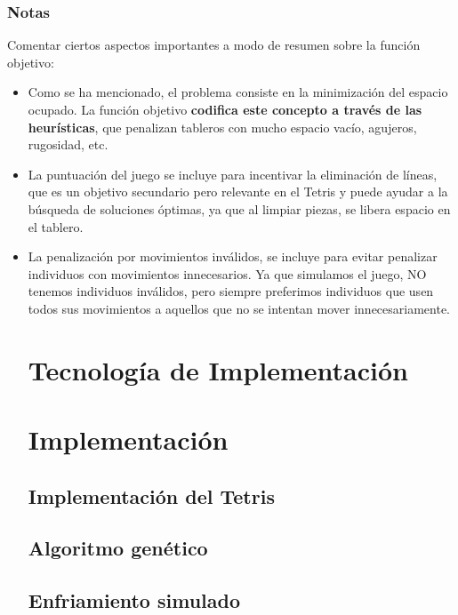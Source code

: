 \documentclass[11pt,spanish,listoffigures,listoftables]{tfgetsinf}
\begin{document}
\subsection{Notas}
Comentar ciertos aspectos importantes a modo de resumen sobre la función objetivo:
\begin{itemize}
    \item Como se ha mencionado, el problema consiste en la minimización del espacio ocupado. La función objetivo \textbf{codifica este concepto a través de las heurísticas}, que penalizan tableros con mucho espacio vacío, agujeros, rugosidad, etc.
    \item La puntuación del juego se incluye para incentivar la eliminación de líneas, que es un objetivo secundario pero relevante en el Tetris y puede ayudar a la búsqueda de soluciones óptimas, ya que al limpiar piezas, se libera espacio en el tablero.
    \item La penalización por movimientos inválidos, se incluye para evitar penalizar individuos con movimientos innecesarios. Ya que simulamos el juego, NO tenemos individuos inválidos, pero siempre preferimos individuos que usen todos sus movimientos a aquellos que no se intentan mover innecesariamente.

\chapter{Tecnología de Implementación}

\chapter{Implementación}

\section{Implementación del Tetris}


\section{Algoritmo genético}

\section{Enfriamiento simulado}



\end{itemize}
\end{document}
